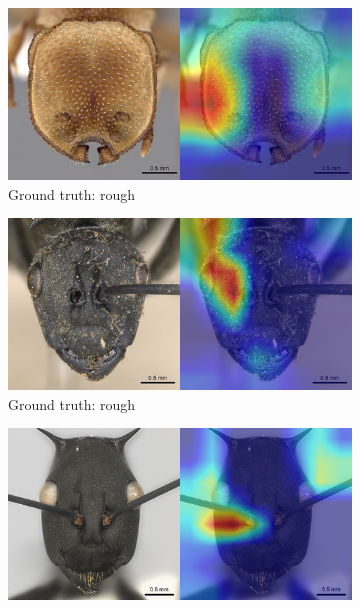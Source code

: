 \documentclass[12pt]{article}
\begin{document}
\begin{figure}
    \centering
    \begin{subfigure}{\subwidth}
        \includegraphics[width=1\linewidth]{assets/gradcam/correct_nonideal/346.png}
        \caption{Ground truth: rough}
        \label{fig:correct_nonideal_346}
    \end{subfigure}
    \begin{subfigure}{\subwidth}
        \includegraphics[width=1\linewidth]{assets/gradcam/correct_nonideal/1554.png}
        \caption{Ground truth: rough}
        \label{fig:correct_nonideal_1554}
    \end{subfigure}
    \begin{subfigure}{\subwidth}
        \includegraphics[width=1\linewidth]{assets/gradcam/correct_nonideal/1694.png}

\end{subfigure}
\end{figure}
\end{document}
